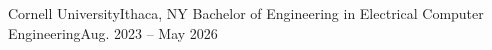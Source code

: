 \resumeSubheading
    {Cornell University}{Ithaca, NY}
    {Bachelor of Engineering in Electrical Computer Engineering}{Aug. 2023 -- May 2026}